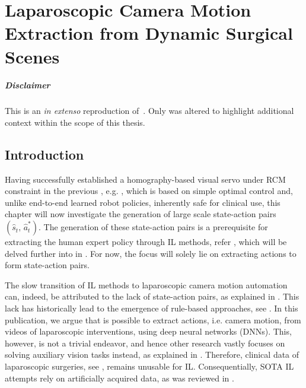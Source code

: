 \graphicspath{{chapter_3}}
\chapter[Laparoscopic Camera Motion Extraction]{Laparoscopic Camera Motion Extraction from Dynamic Surgical Scenes}
\label{chap:camera_motion_extraction}
\minitoc

\paragraph{Disclaimer} This  is an \textit{in extenso} reproduction of~\cite{huber2022deep}. Only  was altered to highlight additional context within the scope of this thesis.

\newpage

\section{Introduction}
\label{c3:sec:introduction}
Having successfully established a homography-based visual servo under RCM constraint in the previous , e.g. , which is based on simple optimal control and, unlike end-to-end learned robot policies, inherently safe for clinical use, this chapter will now investigate the generation of large scale state-action pairs $(\hat{s}_t,\,\hat{a}^*_t)$. The generation of these state-action pairs is a prerequisite for extracting the human expert policy through IL methods, refer , which will be delved further into in . For now, the focus will solely lie on extracting actions to form state-action pairs.

The slow transition of IL methods to laparoscopic camera motion automation can, indeed, be attributed to the lack of state-action pairs, as explained in . This lack has historically lead to the emergence of rule-based approaches, see . In this publication, we argue that is possible to extract actions, i.e. camera motion, from videos of laparoscopic interventions, using deep neural networks (DNNs). This, however, is not a trivial endeavor, and hence other research vastly focuses on solving auxiliary vision tasks instead, as explained in . Therefore, clinical data of laparoscopic surgeries, see , remains unusable for IL. Consequentially, SOTA IL attempts rely on artificially acquired data, as was reviewed in .

